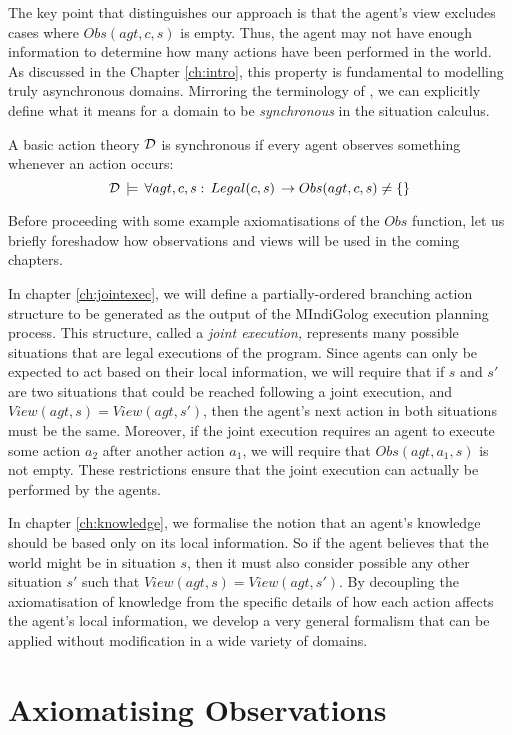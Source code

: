 The key point that distinguishes our approach is that the agent's
view excludes cases where $Obs(agt,c,s)$ is empty. Thus, the agent
may not have enough information to determine how many actions have
been performed in the world. As discussed in the Chapter \ref{ch:intro},
this property is fundamental to modelling truly asynchronous domains.
Mirroring the terminology of \citep{vanBentham06tree_of_knowledge},
we can explicitly define what it means for a domain to be \emph{synchronous}
in the situation calculus.

\begin{defnL}
 A basic action theory $\mathcal{D}$
is synchronous if every agent observes something whenever an action
occurs:\[
\mathcal{D}\,\models\,\forall agt,c,s:\, Legal(c,s)\,\rightarrow Obs(agt,c,s)\neq\{\}\]

\end{defnL}
Before proceeding with some example axiomatisations of the $Obs$
function, let us briefly foreshadow how observations and views will
be used in the coming chapters.

In chapter \ref{ch:jointexec}, we will define a partially-ordered
branching action structure to be generated as the output of the MIndiGolog
execution planning process. This structure, called a \emph{joint execution,}
represents many possible situations that are legal executions of the
program. Since agents can only be expected to act based on their local
information, we will require that if $s$ and $s'$ are two situations
that could be reached following a joint execution, and $View(agt,s)=View(agt,s')$,
then the agent's next action in both situations must be the same.
Moreover, if the joint execution requires an agent to execute some
action $a_{2}$ after another action $a_{1}$, we will require that
$Obs(agt,a_{1},s)$ is not empty. These restrictions ensure that the
joint execution can actually be performed by the agents.

In chapter \ref{ch:knowledge}, we formalise the notion that an agent's
knowledge should be based only on its local information. So if the
agent believes that the world might be in situation $s$, then it
must also consider possible any other situation $s'$ such that $View(agt,s)=View(agt,s')$.
By decoupling the axiomatisation of knowledge from the specific details
of how each action affects the agent's local information, we develop
a very general formalism that can be applied without modification
in a wide variety of domains.


\section{Axiomatising Observations\label{sec:Observations:Axiomatising-simple}}

